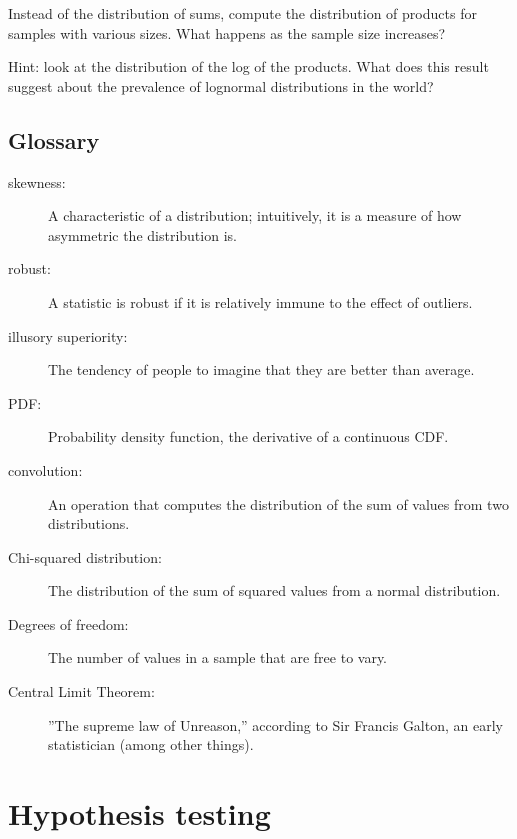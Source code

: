 \documentclass[12pt]{book}
\begin{document}
\begin{ex}

Instead of the distribution of sums, compute the distribution
of products for samples with various sizes.  What happens as
the sample size increases?

Hint: look at the distribution of the log of the products.
What does this result suggest about the prevalence of lognormal
distributions in the world?

\end{ex}


\section{Glossary}

\begin{description}

\item[skewness:] A characteristic of a distribution; intuitively, it
is a measure of how asymmetric the distribution is.

\item[robust:] A statistic is robust if it is relatively immune to the
  effect of outliers.

\item[illusory superiority:] The tendency of people to imagine that
they are better than average.

\item[PDF:] Probability density function, the derivative of a continuous CDF.

\item[convolution:] An operation that computes the distribution of the
sum of values from two distributions. 

\item[Chi-squared distribution:] The distribution of the sum of squared
values from a normal distribution.

\item[Degrees of freedom:] The number of values in a sample that are
free to vary.

\item[Central Limit Theorem:] ''The supreme law of Unreason,'' according
to Sir Francis Galton, an early statistician (among other things).

\end{description}


\chapter{Hypothesis testing}
\end{document}
